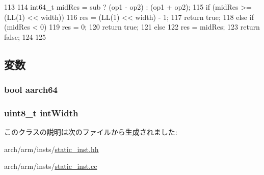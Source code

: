 \begin{DoxyCode}
113     {
114         int64_t midRes = sub ? (op1 - op2) : (op1 + op2);
115         if (midRes >= (LL(1) << width)) {
116             res = (LL(1) << width) - 1;
117             return true;
118         } else if (midRes < 0) {
119             res = 0;
120             return true;
121         } else {
122             res = midRes;
123             return false;
124         }
125     }
\end{DoxyCode}


\subsection{変数}
\hypertarget{classArmISA_1_1ArmStaticInst_a52c06c8a54293998f3e1f71cdbd916f7}{
\subsubsection[{aarch64}]{\setlength{\rightskip}{0pt plus 5cm}bool {\bf aarch64}}}
\label{classArmISA_1_1ArmStaticInst_a52c06c8a54293998f3e1f71cdbd916f7}
\hypertarget{classArmISA_1_1ArmStaticInst_a2a06976c0a3797444170f251f34bd40a}{
\subsubsection[{intWidth}]{\setlength{\rightskip}{0pt plus 5cm}uint8\_\-t {\bf intWidth}}}
\label{classArmISA_1_1ArmStaticInst_a2a06976c0a3797444170f251f34bd40a}


このクラスの説明は次のファイルから生成されました:\begin{DoxyCompactItemize}
\item 
arch/arm/insts/\hyperlink{arch_2arm_2insts_2static__inst_8hh}{static\_\-inst.hh}\item 
arch/arm/insts/\hyperlink{arch_2arm_2insts_2static__inst_8cc}{static\_\-inst.cc}\end{DoxyCompactItemize}
